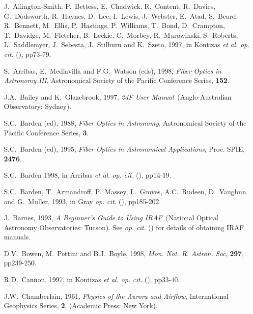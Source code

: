 \documentclass[twoside,11pt]{starlink}
\begin{document}
\newpage
{}
\begin{thebibliography}{99}

   J.~Allington-Smith, P.~Bettess, E.~Chadwick,
   R.~Content, R.~Davies, G.~Dodsworth, R.~Haynes, D.~Lee, I.~Lewis,
   J.~Webster, E.~Atad, S.~Beard, R.~Bennett, M.~Ellis, P.~Hastings,
   P.~Williams, T.~Bond, D.~Crampton, T.~Davidge, M.~Fletcher,
   B.~Leckie, C.~Morbey, R.~Murowinski, S.~Roberts, L.~Saddlemyer,
   J.~Sebesta, J.~Stilburn and K.~Szeto, 1997, in Kontizas \textit{et al.
   op. cit.}\/ (\cite{KONTIZAS97}), pp73-79.

   S.~Arribas, E.~Mediavilla and F.G.~Watson (eds),
   1998, \textit{Fiber Optics in Astronomy III}, Astronomical Society of
   the Pacific Conference Series, \textbf{152}.

   J.A.~Bailey and K.~Glazebrook, 1997, \textit{2dF
   User Manual}\, (Anglo-Australian Observatory: Sydney).

   S.C.~Barden (ed), 1988, \textit{Fiber Optics in
   Astronomy}, Astronomical Society of the Pacific Conference Series,
   \textbf{3}.

   S.C.~Barden (ed), 1995, \textit{Fiber Optics in
   Astronomical Applications}, Proc. SPIE, \textbf{2476}.

   S.C.~Barden 1998, in Arribas \textit{et al. op. cit.}\/
   (\cite{ARRIBAS98}), pp14-19.

   S.C.~Barden, T.~Armandroff, P.~Massey, L.~Groves,
   A.C.~Rudeen, D.~Vaughnn and G.~Muller, 1993, in Gray \textit{op. cit.}\/
   (\cite{GRAY93}), pp185-202.

   J.~Barnes, 1993, \textit{A Beginner's Guide to
   Using IRAF}\, (National Optical Astronomy Observatories: Tucson).
   See  \textit{op. cit.}\/ (\cite{SG12}) for details of
   obtaining IRAF manuals.

   D.V.~Bowen, M.~Pettini and B.J.~Boyle, 1998,
   \textit{Mon. Not. R. Astron. Soc}, \textbf{297}, pp239-250.

   R.D.~Cannon, 1997, in Kontizas \textit{et al.
   op. cit.}\/ (\cite{KONTIZAS97}), pp33-40.

   J.W.~Chamberlain, 1961, \textit{Physics of the
   Aurora and Airflow}, International Geophysics Series, \textbf{2},
   (Academic Press: New York).


\end{thebibliography}
\end{document}
